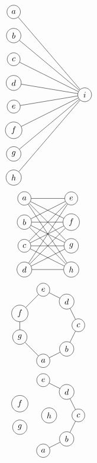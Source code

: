 \documentclass[12pt, A4]{article}
\begin{document}
\begin{enumerate}
\begin{tasks}
\[\begin{tikzpicture}
								\node[circle, draw] (a1) at (0, 0) {\(a\)};
								\node[circle, draw] (a2) at (0, -1) {\(b\)}; 
								\node[circle, draw] (a3) at (0, -2) {\(c\)};
								\node[circle, draw] (a4) at (0, -3) {\(d\)};
								\node[circle, draw] (a5) at (0, -4) {\(e\)};
								\node[circle, draw] (a6) at (0, -5) {\(f\)};
								\node[circle, draw] (a7) at (0, -6) {\(g\)};
								\node[circle, draw] (a8) at (0, -7) {\(h\)};
								\node[circle, draw] (a9) at (3, -3.5) {\(i\)};
								\foreach \x in {1,...,8}
									\draw (a\x) -- (a9);
							\end{tikzpicture}\]
						\task
							\[\begin{tikzpicture}
								\node[circle, draw] (a1) at (0, 0) {\(a\)};
								\node[circle, draw] (a2) at (0, -1) {\(b\)};
								\node[circle, draw] (a3) at (0, -2) {\(c\)};
								\node[circle, draw] (a4) at (0, -3) {\(d\)};
								\node[circle, draw] (a5) at (2, 0) {\(e\)};
								\node[circle, draw] (a6) at (2, -1) {\(f\)};
								\node[circle, draw] (a7) at (2, -2) {\(g\)};
								\node[circle, draw] (a8) at (2, -3) {\(h\)};
								\foreach \x in {1,...,4}
									\foreach \y in {5,...,8}
										\draw (a\x) -- (a\y);
							\end{tikzpicture}\]
						\task
							\[\begin{tikzpicture}
								\node[circle, draw] (a1) at (0, 0) {\(a\)};
								\node[circle, draw] (a2) at (1, 0.5) {\(b\)};
								\node[circle, draw] (a3) at (1.5, 1.5) {\(c\)};
								\node[circle, draw] (a4) at (1, 2.5) {\(d\)};
								\node[circle, draw] (a5) at (0, 3) {\(e\)};
								\node[circle, draw] (a6) at (-1, 2) {\(f\)};
								\node[circle, draw] (a7) at (-1, 1){\(g\)};
								\draw (a1) -- (a2);
								\draw (a2) -- (a3);
								\draw (a3) -- (a4);
								\draw (a4) -- (a5);
								\draw (a5) -- (a6);
								\draw (a6) -- (a7);
								\draw (a7) -- (a1);
							\end{tikzpicture}\]
						\task
							\[\begin{tikzpicture}
								\node[circle, draw] (a1) at (0, 0) {\(a\)};
								\node[circle, draw] (a2) at (1, 0.5) {\(b\)};
								\node[circle, draw] (a3) at (1.5, 1.5) {\(c\)};
								\node[circle, draw] (a4) at (1, 2.5) {\(d\)};
								\node[circle, draw] (a5) at (0, 3) {\(e\)};
								\node[circle, draw] (a6) at (-1, 2) {\(f\)};
								\node[circle, draw] (a7) at (-1, 1){\(g\)};
								\node[circle, draw] (a8) at (0.25, 1.5) {\(h\)};
								\draw (a1) -- (a2);
								\draw (a2) -- (a3);
								\draw (a3) -- (a4);
								\draw (a4) -- (a5);

\end{tikzpicture}\]
\end{tasks}
\end{enumerate}
\end{document}
